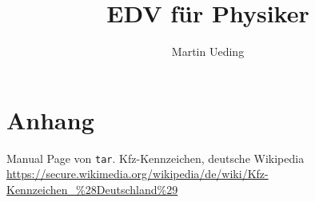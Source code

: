 \documentclass[11pt]{report}
\title{EDV für Physiker}
\author{Martin Ueding}
\newcommand\gqq[1]{\glqq #1\grqq}
\begin{document}
\maketitle
\newpage

\tableofcontents
\newpage







\part{Anhang}

\lstlistoflistings

\begin{thebibliography}{n}
 Manual Page von \texttt{tar}.
 \gqq{Kfz-Kennzeichen}, deutsche Wikipedia \url{https://secure.wikimedia.org/wikipedia/de/wiki/Kfz-Kennzeichen_\%28Deutschland\%29}
\end{thebibliography}
\end{document}
